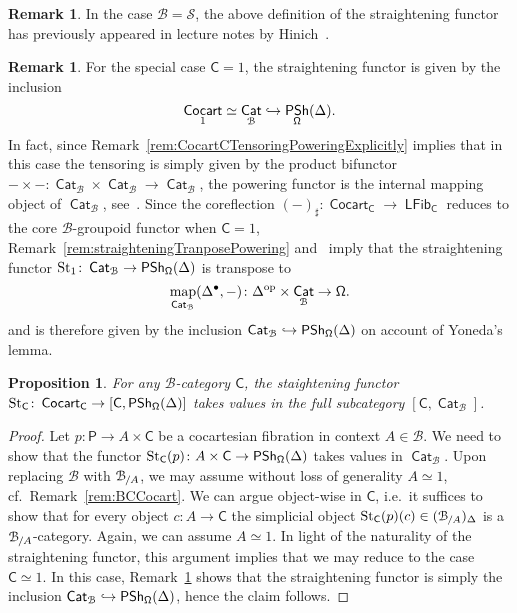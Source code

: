 \documentclass[reqno]{amsart}
\numberwithin{equation}{subsection}
\theoremstyle{plain}
\newtheorem{proposition}[equation]{Proposition}
\theoremstyle{definition}
\newtheorem{remark}[equation]{Remark}
\let\scr=\mathcal
\let\into=\hookrightarrow
\def\BB{\scr B}
\def\SS{\scr S}
\DeclareMathOperator{\IPSh}{\mathsf{PSh}}
\DeclareMathOperator{\ICat}{\mathsf{Cat}}
\DeclareMathOperator{\ICocart}{\mathsf{Cocart}}
\DeclareMathOperator{\ILFib}{\mathsf{LFib}}
\DeclareMathOperator{\Map}{map}
\DeclareMathOperator{\St}{St}
\newcommand{\op}{\mathrm{op}}
\newcommand{\map}[1]{\Map_{#1}}
\newcommand{\Over}[2]{#1_{\hspace{-1pt}/#2}}
\newcommand{\I}[1]{\mathsf{#1}}
\newcommand{\iFun}[2]{{[#1,#2]}}
\newcommand{\Simp}[1]{#1_{\Delta}}
\begin{document}
\begin{remark}
 	In the case $\BB=\SS$, the above definition of the straightening functor has previously appeared in lecture notes by Hinich~\cite{Hinich2017}.
\end{remark}

\begin{remark}
	\label{rem:StraigeningPoint}
	For the special case $\I{C}= 1$, the straightening functor is given by the inclusion 
	\begin{equation*}
	\ICocart_{1}\simeq\ICat_{\BB}\into\IPSh_{\Univ}(\Delta).
	\end{equation*}
	In fact, since Remark~\ref{rem:CocartCTensoringPoweringExplicitly} implies that in this case the tensoring is simply given by the product bifunctor $-\times-\colon\ICat_{\BB}\times\ICat_{\BB}\to\ICat_{\BB}$, the powering functor is the internal mapping object of $\ICat_{\BB}$, see~\cite[Corollary~4.5.5]{Martini2021a}. Since the coreflection $(-)_\sharp\colon \ICocart_{\I{C}}\to\ILFib_{\I{C}}$ reduces to the core $\BB$-groupoid functor when $\I{C}=1$, Remark~\ref{rem:straighteningTranposePowering} and~\cite[Remark~4.5.6]{Martini2021a} imply that the straightening functor $\St_1\colon \ICat_{\BB}\to \IPSh_{\Univ}(\Delta)$ is transpose to
	\begin{equation*}
	\map{\ICat_{\BB}}(\Delta^{\bullet},-)\colon \Delta^{\op}\times\ICat_{\BB}\to\Univ.
	\end{equation*}
	and is therefore given by the inclusion $\ICat_{\BB}\into\IPSh_{\Univ}(\Delta)$ on account of Yoneda's lemma.
\end{remark}

\begin{proposition}
	\label{prop:StraighteningIsCategory}
	For any $\BB$-category $\I{C}$, the staightening functor $\St_{\I{C}}\colon\ICocart_{\I{C}}\to\iFun{\I{C}}{\IPSh_{\Univ}(\Delta)}$ takes values in the full subcategory $\iFun{\I{C}}{\ICat_{\BB}}$.
\end{proposition}
\begin{proof}
	Let $p\colon \I{P}\to A\times\I{C}$ be a cocartesian fibration in context $A\in\BB$. We need to show that the functor $\St_{\I{C}}(p)\colon A\times\I{C}\to\IPSh_{\Univ}(\Delta)$ takes values in $\ICat_{\BB}$. Upon replacing $\BB$ with $\Over{\BB}{A}$, we may assume without loss of generality $A\simeq 1$, cf.\ Remark~\ref{rem:BCCocart}. We can argue object-wise in $\I{C}$, i.e.\ it suffices to show that for every object $c\colon A\to \I{C}$ the simplicial object $\St_{\I{C}}(p)(c)\in\Simp{(\Over{\BB}{A})}$ is a $\Over{\BB}{A}$-category. Again, we can assume $A\simeq 1$. In light of the naturality of the straightening functor, this argument implies that we may reduce to the case $\I{C}\simeq 1$. In this case, Remark~\ref{rem:StraigeningPoint} shows that the straightening functor is simply the inclusion $\ICat_{\BB}\into\IPSh_{\Univ}(\Delta)$, hence the claim follows.
\end{proof}
\end{document}
